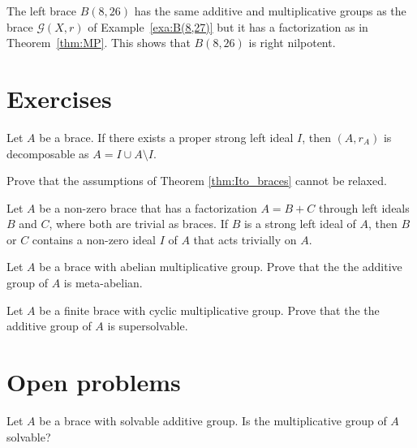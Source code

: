 \begin{example}
The left brace $B(8,26)$ has the same additive and multiplicative groups as the brace $\mathcal{G}(X,r)$ 
of Example~\ref{exa:B(8,27)} but it has a factorization as in Theorem~\ref{thm:MP}. 
This shows that $B(8,26)$ is right nilpotent. 
\end{example}



\section*{Exercises}


\begin{prob}
\label{prob:decomposable}
Let $A$ be a brace. If there exists a proper strong left ideal $I$, 
then $(A,r_A)$ is decomposable as $A = I \cup A\setminus I$. 
\end{prob}

\begin{prob}
\label{prob:Ito_relaxed}
Prove that the assumptions of Theorem \ref{thm:Ito_braces} cannot be relaxed. 
\end{prob}

\begin{prob}
\label{prob:Ito_version2}
Let $A$ be a non-zero brace that has a factorization $A=B+C$ through left ideals $B$ and $C$, where both are trivial as braces. If $B$ is a strong left ideal of $A$, then $B$ or $C$ contains a non-zero ideal $I$ of $A$ that acts trivially on $A$.
\end{prob}



\begin{prob}
\label{prob:mul_abelian}
Let $A$ be a brace with abelian multiplicative group. Prove that the 
the additive group of $A$ is meta-abelian. 
\end{prob}

\begin{prob}
\label{prob:mul_cyclic}
Let $A$ be a finite brace with cyclic multiplicative group. Prove that the 
the additive group of $A$ is supersolvable. 
\end{prob}

\section*{Open problems}

\begin{problem}
\label{problem:Byott}
    Let $A$ be a brace with solvable additive group. Is the 
    multiplicative group of $A$ solvable?
\end{problem}

